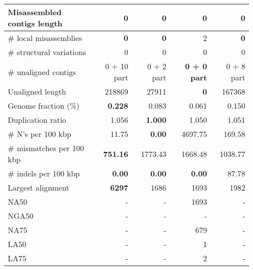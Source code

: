 \documentclass[12pt,a4paper]{article}
\begin{document}
\begin{table}[ht]
\begin{center}
\begin{tabular}{|l*{4}{|r}|}
Misassembled contigs length & 0 & 0 & 0 & 0 \\ \hline
\# local misassemblies & {\bf 0} & {\bf 0} & 2 & {\bf 0} \\ \hline
\# structural variations & 0 & 0 & 0 & 0 \\ \hline
\# unaligned contigs & 0 + 10 part & 0 + 2 part & {\bf 0 + 0 part} & 0 + 8 part \\ \hline
Unaligned length & 218869 & 27911 & {\bf 0} & 167368 \\ \hline
Genome fraction (\%) & {\bf 0.228} & 0.083 & 0.061 & 0.150 \\ \hline
Duplication ratio & 1.056 & {\bf 1.000} & 1.050 & 1.051 \\ \hline
\# N's per 100 kbp & 11.75 & {\bf 0.00} & 4697.75 & 169.58 \\ \hline
\# mismatches per 100 kbp & {\bf 751.16} & 1773.43 & 1668.48 & 1038.77 \\ \hline
\# indels per 100 kbp & {\bf 0.00} & {\bf 0.00} & {\bf 0.00} & 87.78 \\ \hline
Largest alignment & {\bf 6297} & 1686 & 1693 & 1982 \\ \hline
NA50 & - & - & 1693 & - \\ \hline
NGA50 & - & - & - & - \\ \hline
NA75 & - & - & 679 & - \\ \hline
LA50 & - & - & 1 & - \\ \hline
LA75 & - & - & 2 & - \\ \hline
\end{tabular}
\end{center}
\end{table}
\end{document}
